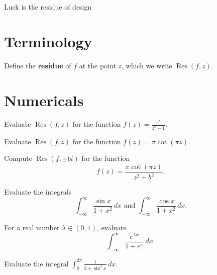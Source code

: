 \documentclass{homework}
\author{Jim Fowler}
\DeclareMathOperator{\Res}{Res}
\begin{document}
\maketitle

\begin{inspiration}
  Luck is the residue of design
\end{inspiration}

\section{Terminology}

\begin{problem}
  Define the \textbf{residue} of $f$ at the point $z$, which we write $\Res(f,z)$.
\end{problem}

\section{Numericals}

\begin{problem}
  Evaluate $\Res(f,z)$ for the function $f(z) = \displaystyle\frac{e^z}{z^2-1}$.
\end{problem}

\begin{problem}\label{residues-all-one}Evaluate $\Res(f,z)$ for the
  function $f(z) = \pi \cot (\pi z)$.
\end{problem}

\begin{problem}\label{residue-coth}Compute $\Res(f,\pm bi)$ for the
  function
  \[
    f(z) = \frac{\pi \cot(\pi z)}{z^2 + b^2}.
  \]
\end{problem}

\begin{problem}
  Evaluate the integrals
  \[
    \int_{-\infty}^\infty \frac{\sin x}{1+x^2} \, dx \mbox{ and }
    \int_{-\infty}^\infty \frac{\cos x}{1+x^2} \, dx.
  \]
\end{problem}

\begin{problem}
  For a real number $\lambda \in (0,1)$, evaluate
  \[
    \int_{-\infty}^\infty \frac{e^{\lambda x}}{1 + e^x} \, dx.
  \]
\end{problem}

\begin{problem}
  Evaluate the integral $\displaystyle\int_{0}^{2\pi} \frac{1}{3 + \sin^2 x} \, dx$.
\end{problem}
\end{document}
